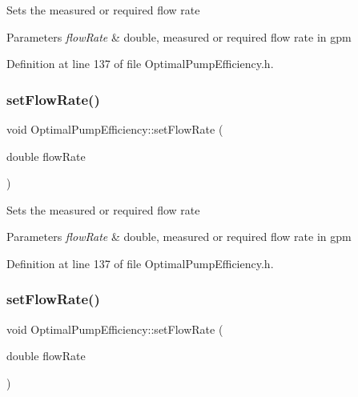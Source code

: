Sets the measured or required flow rate 
\begin{DoxyParams}{Parameters}
{\em flow\+Rate} & double, measured or required flow rate in gpm \\
\hline
\end{DoxyParams}


Definition at line 137 of file Optimal\+Pump\+Efficiency.\+h.

\mbox{\label{class_optimal_pump_efficiency_a90067b57c559fd3274fb8d6e00f6221d}} 
\subsubsection{\texorpdfstring{set\+Flow\+Rate()}{setFlowRate()}\hspace{0.1cm}{\footnotesize\ttfamily [2/3]}}
{\footnotesize\ttfamily void Optimal\+Pump\+Efficiency\+::set\+Flow\+Rate (\begin{DoxyParamCaption}\item[{double}]{flow\+Rate }\end{DoxyParamCaption})\hspace{0.3cm}{\ttfamily [inline]}}

Sets the measured or required flow rate 
\begin{DoxyParams}{Parameters}
{\em flow\+Rate} & double, measured or required flow rate in gpm \\
\hline
\end{DoxyParams}


Definition at line 137 of file Optimal\+Pump\+Efficiency.\+h.

\mbox{\label{class_optimal_pump_efficiency_a90067b57c559fd3274fb8d6e00f6221d}} 
\subsubsection{\texorpdfstring{set\+Flow\+Rate()}{setFlowRate()}\hspace{0.1cm}{\footnotesize\ttfamily [3/3]}}
{\footnotesize\ttfamily void Optimal\+Pump\+Efficiency\+::set\+Flow\+Rate (\begin{DoxyParamCaption}\item[{double}]{flow\+Rate }\end{DoxyParamCaption})\hspace{0.3cm}{\ttfamily [inline]}}

